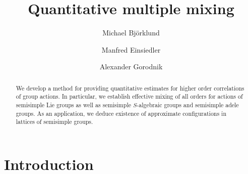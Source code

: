 \documentclass[11pt,reqno,a4paper]{amsart}
\numberwithin{equation}{section}
\theoremstyle{theorem}
\theoremstyle{definition}
\begin{document}
\title{Quantitative multiple mixing}

\author{Michael Bj\"orklund}
\address{Department of Mathematics, Chalmers, Gothenburg, Sweden}

\author{Manfred Einsiedler}
\address{Department of Mathematics, ETH, Z\"urich, Switzerland}

\author{Alexander Gorodnik}
\address{School of Mathematics, University of Bristol, Bristol, UK}



\date{}


\maketitle

\begin{abstract}
We develop a method for providing quantitative estimates for higher order correlations
 of group actions. In particular, we establish effective mixing of all orders for 
 actions of semisimple Lie groups as well as semisimple $S$-algebraic groups and semisimple adele groups.
 As an application, we deduce existence of approximate configurations in lattices
 of semisimple groups.
\end{abstract}

\section{Introduction}
\end{document}
